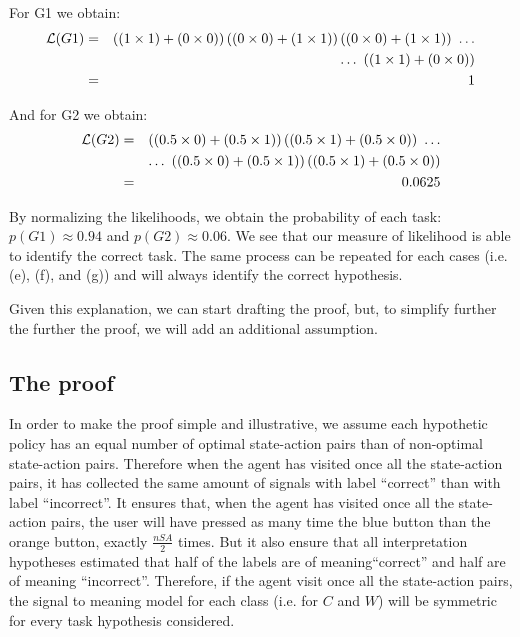 For G1 we obtain:
%
\begin{eqnarray}
\mathcal{L}(G1) &=& \left((1\times1)+(0\times0)\right)\left((0\times0)+(1\times1)\right)\left((0\times0)+(1\times1)\right)~\ldots  \nonumber \\
&& \ldots~\left((1\times1)+(0\times0)\right)  \nonumber \\
&=& 1 \nonumber
\end{eqnarray}

And for G2 we obtain:
%
\begin{eqnarray}
\mathcal{L}(G2) &=& \left((0.5\times0)+(0.5\times1)\right)\left((0.5\times1)+(0.5\times0)\right)~\ldots  \nonumber \\
&& \ldots~\left((0.5\times0)+(0.5\times1)\right)\left((0.5\times1)+(0.5\times0)\right) \nonumber \\
&=& 0.0625 \nonumber
\end{eqnarray}

By normalizing the likelihoods, we obtain the probability of each task: $p(G1) \approx 0.94$ and $p(G2) \approx 0.06$. We see that our measure of likelihood is able to identify the correct task. The same process can be repeated for each cases (i.e. (e), (f), and (g)) and will always identify the correct hypothesis.

Given this explanation, we can start drafting the proof, but, to simplify further the further the proof, we will add an additional assumption.

\subsection{The proof}

In order to make the proof simple and illustrative, we assume each hypothetic policy has an equal number of optimal state-action pairs than of non-optimal state-action pairs. Therefore when the agent has visited once all the state-action pairs, it has collected the same amount of signals with label ``correct'' than with label ``incorrect''. It ensures that, when the agent has visited once all the state-action pairs, the user will have pressed as many time the blue button than the orange button, exactly $\frac{nSA}{2}$ times. But it also ensure that all interpretation hypotheses estimated that half of the labels are of meaning``correct'' and half are of meaning ``incorrect''. Therefore, if the agent visit once all the state-action pairs, the signal to meaning model for each class (i.e. for $C$ and $W$) will be symmetric for every task hypothesis considered. 

